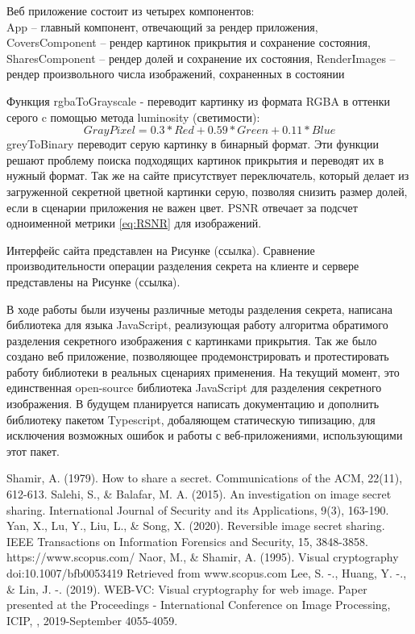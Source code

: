 \documentclass[a4paper,article,14pt]{extarticle}
\begin{document}
Веб приложение состоит из четырех компонентов: \\ 
App -- главный компонент, отвечающий за рендер приложения, \\
CoversComponent -- рендер картинок прикрытия и сохранение состояния,
SharesComponent -- рендер долей и сохранение их состояния, 
RenderImages -- рендер произвольного числа изображений, сохраненных в состоянии

Функция rgbaToGrayscale - переводит картинку из формата RGBA в оттенки серого c помощью метода luminosity (светимости): 
$$ GrayPixel = 0.3*Red + 0.59*Green + 0.11*Blue$$
greyToBinary переводит серую картинку в бинарный формат. Эти функции решают проблему поиска подходящих картинок прикрытия и переводят их в нужный формат.
Так же на сайте присутствует переключатель, который делает из загруженной секретной цветной картинки серую, позволяя снизить размер долей,
если в сценарии приложения не важен цвет. PSNR отвечает за подсчет одноименной метрики \ref{eq:RSNR} для изображений. 

Интерфейс сайта представлен на Рисунке (ссылка). Сравнение производительности операции разделения секрета на клиенте и сервере
представлены на Рисунке (ссылка).


\newpage
{}
В ходе работы были изучены различные методы разделения секрета, написана библиотека для языка JavaScript, реализующая работу алгоритма 
обратимого разделения секретного изображения с картинками прикрытия. Так же было создано веб приложение, позволяющее продемонстрировать и 
протестировать работу библиотеки в реальных сценариях применения. На текущий момент, это единственная open-source библиотека JavaScript для 
разделения секретного изображения. В будущем планируется написать документацию и дополнить библиотеку пакетом Typescript, 
добаляющем статическую типизацию, для исключения возможных ошибок и работы с веб-приложениями, использующими этот пакет.

\newpage    
\begin{thebibliography}{1}
 Shamir, A. (1979). How to share a secret. Communications of the ACM, 22(11), 612-613.
 Salehi, S., \& Balafar, M. A. (2015). An investigation on image secret sharing. International Journal of Security and its Applications, 9(3), 163-190.
 Yan, X., Lu, Y., Liu, L., \& Song, X. (2020). Reversible image secret sharing. IEEE Transactions on Information Forensics and Security, 15, 3848-3858.
 https://www.scopus.com/
 Naor, M., & Shamir, A. (1995). Visual cryptography doi:10.1007/bfb0053419 Retrieved from www.scopus.com
 Lee, S. -., Huang, Y. -., & Lin, J. -. (2019). WEB-VC: Visual cryptography for web image. Paper presented at the Proceedings - International Conference on Image Processing, ICIP, , 2019-September 4055-4059.
\end{thebibliography}
\end{document}
